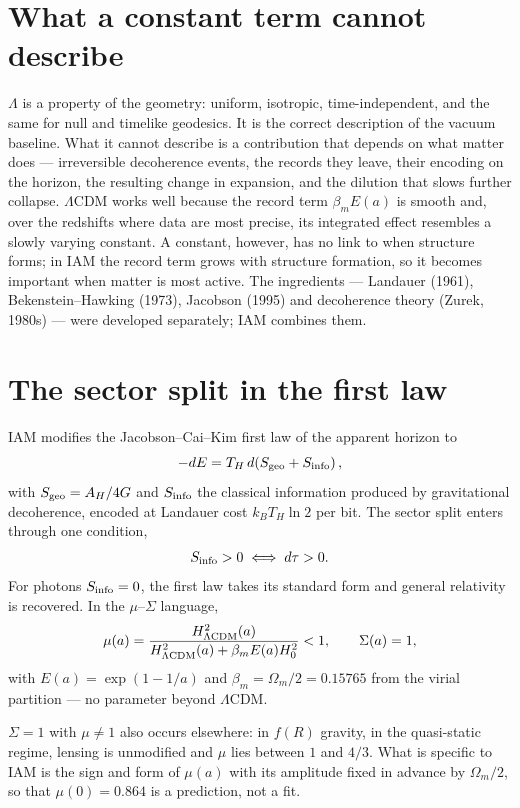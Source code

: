 \section{What a constant term cannot describe}
$\Lambda$ is a property of the geometry: uniform, isotropic, time-independent, and the same for null and timelike geodesics. It is the correct description of the
vacuum baseline. What it cannot describe is a contribution that depends on what matter does --- irreversible decoherence events, the records they leave,
their encoding on the horizon, the resulting change in expansion, and the dilution that slows further collapse. $\Lambda$CDM works well because the record term
$\beta_mE(a)$ is smooth and, over the redshifts where data are most precise, its integrated effect resembles a slowly varying constant. A constant, however, has
no link to when structure forms; in IAM the record term grows with structure formation, so it becomes important when matter is most active. The ingredients ---
Landauer (1961), Bekenstein--Hawking (1973), Jacobson (1995) and decoherence theory (Zurek, 1980s) --- were developed separately; IAM combines them.

\section{The sector split in the first law}
IAM modifies the Jacobson--Cai--Kim first law of the apparent horizon to
\begin{equation}
-dE=T_H\,d\!\left(S_{\rm geo}+S_{\rm info}\right),
\end{equation}
with $S_{\rm geo}=A_H/4G$ and $S_{\rm info}$ the classical information produced by gravitational decoherence, encoded at Landauer cost $k_BT_H\ln2$ per bit. The
sector split enters through one condition,
\begin{equation}
S_{\rm info}>0\iff d\tau>0 .
\end{equation}
For photons $S_{\rm info}=0$, the first law takes its standard form and general relativity is recovered. In the $\mu$--$\Sigma$ language,
\begin{equation}
\mu(a)=\frac{H^2_{\Lambda{\rm CDM}}(a)}{H^2_{\Lambda{\rm CDM}}(a)+\beta_mE(a)H_0^2}<1,\qquad\Sigma(a)=1,
\end{equation}
with $E(a)=\exp(1-1/a)$ and $\beta_m=\Omega_m/2=0.15765$ from the virial partition --- no parameter beyond $\Lambda$CDM.

$\Sigma=1$ with $\mu\neq1$ also occurs elsewhere: in $f(R)$ gravity, in the quasi-static regime, lensing is unmodified and $\mu$ lies between $1$ and $4/3$.
What is specific to IAM is the sign and form of $\mu(a)$ with its amplitude fixed in advance by $\Omega_m/2$, so that $\mu(0)=0.864$ is a prediction, not a fit.

